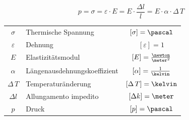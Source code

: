 \vspace{-0.2cm}

$$\boxed{ p = \sigma = \varepsilon \cdot E = E \cdot \frac{\Delta l}{l} =  E \cdot \alpha \cdot \Delta \, T } $$

\renewcommand{\arraystretch}{1.3}
\begin{tabular}{c l c}
	$\sigma$ 		& Thermische Spannung 			& $[\sigma] = \pascal$ 				\\
	$\varepsilon$ 	& Dehnung 						& $[\varepsilon] = 1$ 				\\
	$E$ 			& Elastizitätsmodul 			& $[E] = \frac{\newton}{\meter^2}$ 	\\
	$\alpha$ 		& Längenausdehnungskoeffizient 	& $[\alpha] = \frac{1}{\kelvin}$ 	\\ 
	$\Delta \, T $ 	& Temperaturänderung 			& $[\Delta \, T ] = \kelvin$ 		\\
	$\Delta l$		& Allungamento impedito			& $[\Delta k] = \meter$				\\
	$p$ 			& Druck 						& $[p] = \pascal$
\end{tabular}\medbreak


\renewcommand{\arraystretch}{1}

